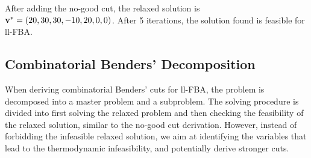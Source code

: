 After adding the no-good cut, the relaxed solution is $\bold v^* = (20, 30, 30, -10, 20, 0, 0)$. After 5 iterations, the solution found is feasible for \textsf{ll-FBA}.

\subsection{Combinatorial Benders' Decomposition} \label{section:cb}
 When deriving combinatorial Benders' cuts for ll-FBA, the problem is decomposed into a master problem and a subproblem. The solving procedure is divided into first solving the relaxed problem and then checking the feasibility of the relaxed solution, similar to the no-good cut derivation. However, instead of forbidding the infeasible relaxed solution, we aim at identifying the variables that lead to the thermodynamic infeasibility, and potentially derive stronger cuts.

